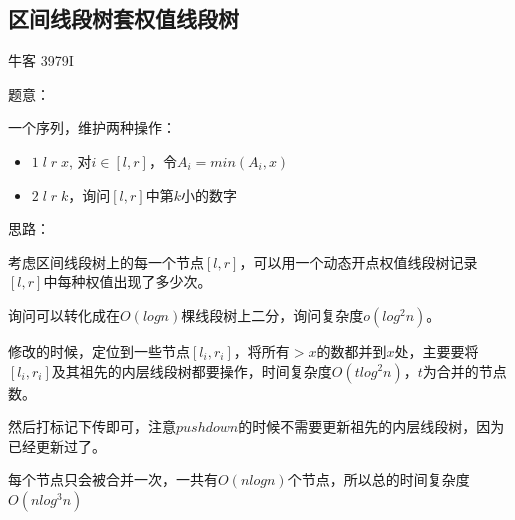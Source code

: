 \subsection{区间线段树套权值线段树}
牛客 3979I\par
题意：\par
一个序列，维护两种操作：\par
\begin{itemize}
\item $1\;l\;r\;x$, 对$i \in [l, r]$，令$A_i = min(A_i, x)$
\item $2\;l\;r\;k$，询问$[l, r]$中第$k$小的数字
\end{itemize} \par
思路：\par
考虑区间线段树上的每一个节点$[l, r]$，可以用一个动态开点权值线段树记录$[l, r]$中每种权值出现了多少次。\par
询问可以转化成在$O(logn)$棵线段树上二分，询问复杂度$o(log^2n)$。\par
修改的时候，定位到一些节点$[l_i, r_i]$，将所有$> x$的数都并到$x$处，主要要将$[l_i, r_i]$及其祖先的内层线段树都要操作，时间复杂度$O(tlog^2n)$，$t$为合并的节点数。\par
然后打标记下传即可，注意$pushdown$的时候不需要更新祖先的内层线段树，因为已经更新过了。\par
每个节点只会被合并一次，一共有$O(nlogn)$个节点，所以总的时间复杂度$O(nlog^3n)$\par
